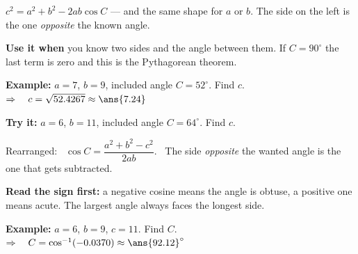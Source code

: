 \documentclass[12pt]{article}
\begin{document}


\begin{formulabox}
$c^2 = a^2 + b^2 - 2ab\cos C$ \quad --- and the same shape for $a$ or $b$. The side on the left is the one \emph{opposite} the known angle.\par
\textbf{Use it when} you know two sides and the angle between them. If $C = 90^\circ$ the last term is zero and this is the Pythagorean theorem.
\end{formulabox}

\begin{examplebox}
\textbf{Example:} \quad $a = 7$, $b = 9$, included angle $C = 52^\circ$. Find $c$.
$\Rightarrow\quad c = \sqrt{52.4267} \approx \ans{7.24}$
\end{examplebox}

\begin{tryitbox}
\textbf{Try it:} \quad $a = 6$, $b = 11$, included angle $C = 64^\circ$. Find $c$.\\[2pt]
\end{tryitbox}


\begin{formulabox}
Rearranged: \ $\cos C = \dfrac{a^2 + b^2 - c^2}{2ab}$. \ The side \emph{opposite} the wanted angle is the one that gets subtracted.\par
\textbf{Read the sign first:} a negative cosine means the angle is obtuse, a positive one means acute. The largest angle always faces the longest side.
\end{formulabox}

\begin{examplebox}
\textbf{Example:} \quad $a = 6$, $b = 9$, $c = 11$. Find $C$.
$\Rightarrow\quad C = \cos^{-1}(-0.0370) \approx \ans{92.12}^\circ$
\end{examplebox}
\end{document}
